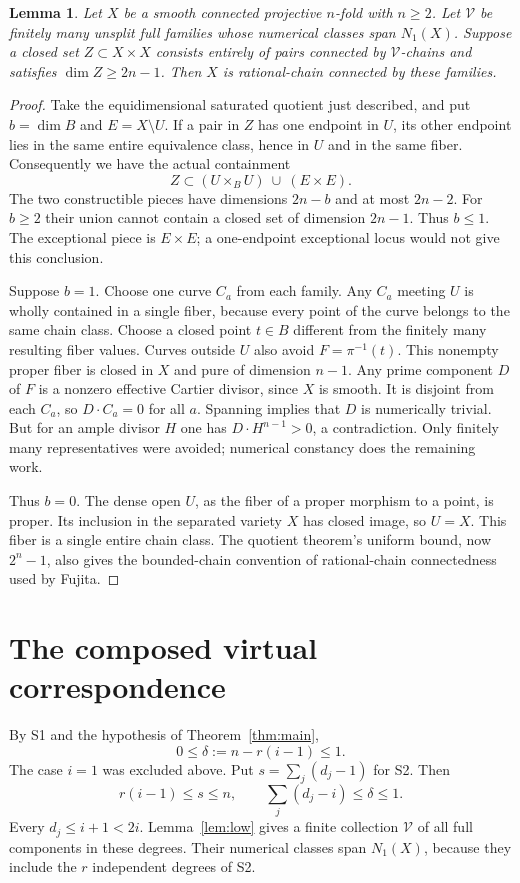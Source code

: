 \documentclass[11pt]{article}
\newtheorem{lemma}[theorem]{Lemma}
\theoremstyle{definition}\newtheorem{definition}[theorem]{Definition}
\theoremstyle{remark}\newtheorem{remark}[theorem]{Remark}
\begin{document}
\begin{lemma}\label{lem:connect}
Let $X$ be a smooth connected projective $n$-fold with $n\ge2$. Let
$\mathcal V$ be finitely many unsplit full families whose numerical classes
span $N_1(X)$. Suppose a closed set $Z\subset X\times X$ consists entirely
of pairs connected by $\mathcal V$-chains and satisfies $\dim Z\ge2n-1$.
Then $X$ is rational-chain connected by these families.
\end{lemma}
\begin{proof}
Take the equidimensional saturated quotient just described, and put
$b=\dim B$ and $E=X\setminus U$. If a pair in $Z$ has one endpoint in $U$,
its other endpoint lies in the same entire equivalence class, hence in $U$
and in the same fiber. Consequently we have the actual containment
\begin{equation}\label{eq:saturated}
 Z\subset (U\times_B U)\ \cup\ (E\times E).
\end{equation}
The two constructible pieces have dimensions $2n-b$ and at most $2n-2$.
For $b\ge2$ their union cannot contain a closed set of dimension $2n-1$.
Thus $b\le1$. The exceptional piece is $E\times E$; a one-endpoint
exceptional locus would not give this conclusion.

Suppose $b=1$. Choose one curve $C_a$ from each family. Any $C_a$ meeting
$U$ is wholly contained in a single fiber, because every point of the curve
belongs to the same chain class. Choose a closed point $t\in B$ different
from the finitely many resulting fiber values. Curves outside $U$ also
avoid $F=\pi^{-1}(t)$. This nonempty proper fiber is closed in $X$ and pure
of dimension $n-1$. Any prime component $D$ of $F$ is a nonzero effective
Cartier divisor, since $X$ is smooth. It is disjoint from each $C_a$, so
$D\cdot C_a=0$ for all $a$. Spanning implies that $D$ is numerically
trivial. But for an ample divisor $H$ one has $D\cdot H^{n-1}>0$, a
contradiction. Only finitely many representatives were avoided; numerical
constancy does the remaining work.

Thus $b=0$. The dense open $U$, as the fiber of a proper morphism to a
point, is proper. Its inclusion in the separated variety $X$ has closed
image, so $U=X$. This fiber is a single entire chain class. The quotient
theorem's uniform bound, now $2^n-1$, also gives the bounded-chain
convention of rational-chain connectedness used by Fujita.
\end{proof}

\section{The composed virtual correspondence}\label{sec:cycle}
By S1 and the hypothesis of Theorem~\ref{thm:main},
\[
 0\le\delta:=n-r(i-1)\le1.
\]
The case $i=1$ was excluded above. Put $s=\sum_j(d_j-1)$ for S2. Then
\begin{equation}\label{eq:budget}
 r(i-1)\le s\le n,\qquad
 \sum_j(d_j-i)\le\delta\le1.
\end{equation}
Every $d_j\le i+1<2i$. Lemma~\ref{lem:low} gives a finite collection
$\mathcal V$ of all full components in these degrees. Their numerical
classes span $N_1(X)$, because they include the $r$ independent degrees
of S2.
\end{document}
